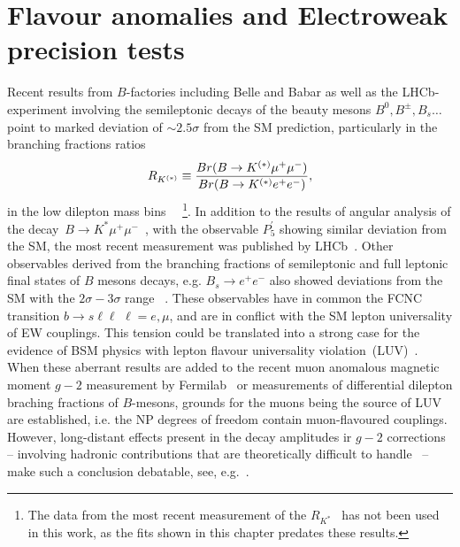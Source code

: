 
\chapter{Flavour anomalies and Electroweak precision tests}\label{chap:flav}
Recent results from $B$-factories including Belle and Babar as well as the LHCb-experiment involving the semileptonic decays of the beauty mesons $B^0, B^\pm,B_s \dots$ point to marked deviation of $ \sim 2.5 \sigma$ from the SM prediction, particularly in the branching fractions ratios
\begin{equation}
R_{K^{(*)}} \equiv {Br(B \to K^{(*)} \mu^{+} \mu^{-}) \over Br(B \to K^{(*)} e^{+} e^{-})},
\end{equation}
in the low dilepton mass bins ~\cite{Aaij:2014ora,Aaij:2017vbb,Aaij:2019wad,Abdesselam:2019wac,LHCb:2021trn}~\footnote{The data from the most recent measurement of the $R_{K^*}$~\cite{LHCb:2021trn} has not been used in this work, as the fits shown in this chapter predates these results.}. In addition to the results of angular analysis of the decay~$B \to K^{*} \mu^{+} \mu^{-}$~\cite{Descotes-Genon:2013wba,Descotes-Genon:2015uva}, with the observable $P_5^\prime$  showing similar deviation from the SM, the most recent measurement was published by LHCb~\cite{LHCb:2020lmf}. Other observables derived from the branching fractions of semileptonic and full leptonic final states of $B$ mesons decays, e.g. $ B_{s} \to e^{+} e^{-}$ also showed deviations from the SM with the $2\sigma-3\sigma$ range ~\cite{Chatrchyan:2013bka,Aaij:2017vad,Aaboud:2018mst,Aaij:2020nol}. These observables have in common the FCNC transition $ b \to s \ell \ell\, \, \ell = e, \mu$, and are in conflict with the SM lepton universality of EW couplings. This tension could be translated into a strong case for the evidence of BSM physics with lepton flavour universality violation~(LUV)~\cite{Hiller:2014yaa,Hiller:2014ula,Bordone:2016gaq}.\\
When these aberrant results are added to the recent muon anomalous magnetic moment $g-2$ measurement by Fermilab~\cite{Muong-2:2021ojo} or measurements of differential dilepton braching fractions of $B$-mesons,  grounds for the muons being the source of LUV are established, i.e.  the NP degrees of freedom contain muon-flavoured couplings.  However, long-distant effects present in the decay amplitudes ir $g-2$ corrections~\cite{Khodjamirian:2010vf,Lyon:2014hpa,Chobanova:2017ghn,Blake:2017fyh,Bobeth:2017vxj} -- involving hadronic contributions that are theoretically difficult to handle~\cite{Jager:2014rwa,Ciuchini:2015qxb,Arbey:2018ics,Chrzaszcz:2018yza} -- make such a conclusion debatable, see, e.g.~\cite{Ciuchini:2018anp,Hurth:2020rzx}. \\
